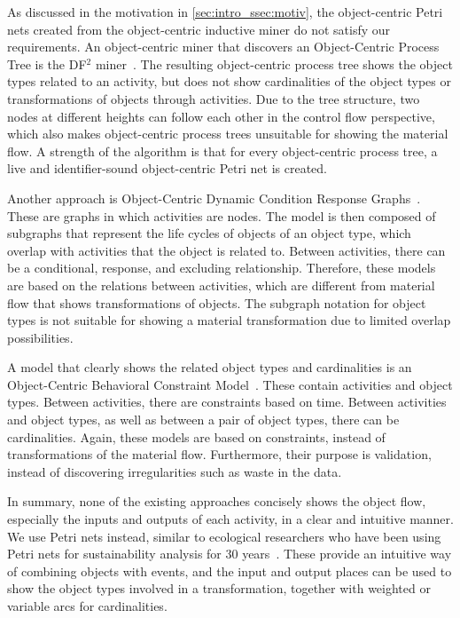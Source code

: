 As discussed in the motivation in \cref{sec:intro_ssec:motiv}, the object-centric Petri nets created from the object-centric inductive miner do not satisfy our requirements.
An object-centric miner that discovers an Object-Centric Process Tree is the DF$^2$ miner~\autocite{vandetten2024}.
The resulting object-centric process tree shows the object types related to an activity, but does not show cardinalities of the object types or transformations of objects through activities.
Due to the tree structure, two nodes at different heights can follow each other in the control flow perspective, which also makes object-centric process trees unsuitable for showing the material flow.
A strength of the algorithm is that for every object-centric process tree, a live and identifier-sound object-centric Petri net is created.



Another approach is Object-Centric Dynamic Condition Response Graphs~\autocite{christfort2024}.
These are graphs in which activities are nodes.
The model is then composed of subgraphs that represent the life cycles of objects of an object type, which overlap with activities that the object is related to.
Between activities, there can be a conditional, response, and excluding relationship.
Therefore, these models are based on the relations between activities, which are different from material flow that shows transformations of objects.
The subgraph notation for object types is not suitable for showing a material transformation due to limited overlap possibilities.



A model that clearly shows the related object types and cardinalities is an Object-Centric Behavioral Constraint Model~\autocite{li2017}.
These contain activities and object types.
Between activities, there are constraints based on time.
Between activities and object types, as well as between a pair of object types, there can be cardinalities.
Again, these models are based on constraints, instead of transformations of the material flow.
Furthermore, their purpose is validation, instead of discovering irregularities such as waste in the data.



In summary, none of the existing approaches concisely shows the object flow, especially the inputs and outputs of each activity, in a clear and intuitive manner.
We use Petri nets instead, similar to ecological researchers who have been using Petri nets for sustainability analysis for 30 years~\autocite{moller1995}.
These provide an intuitive way of combining objects with events, and the input and output places can be used to show the object types involved in a transformation, together with weighted or variable arcs for cardinalities.



